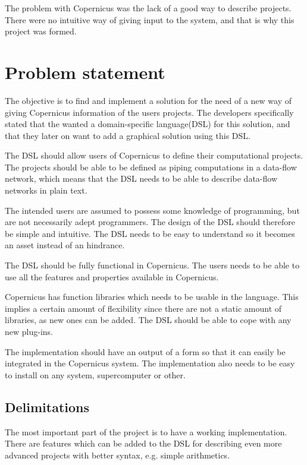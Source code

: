 

The problem with Copernicus was the lack of a good way to describe
projects. There were no intuitive way of giving input to the system,
and that is why this project was formed.


\section{Problem statement}
The objective is to find and implement a solution for the need of a
new way of giving Copernicus information of the users projects. The
developers specifically stated that the wanted a domain-specific
language(DSL) for this solution, and that they later on want to add a
graphical solution using this DSL.

The DSL should allow users of Copernicus to define their computational
projects. The projects should be able to be defined as piping
computations in a data-flow network, which means that the DSL needs to
be able to describe data-flow networks in plain text.

The intended users are assumed to possess some knowledge of
programming, but are not necessarily adept programmers. The design of
the DSL should therefore be simple and intuitive. The DSL needs to be
easy to understand so it becomes an asset instead of an hindrance.

The DSL should be fully functional in Copernicus. The users needs to
be able to use all the features and properties available in
Copernicus.

Copernicus has function libraries which needs to be usable in the
language. This implies a certain amount of flexibility since there are
not a static amount of libraries, as new ones can be added. The DSL
should be able to cope with any new plug-ins.

The implementation should have an output of a form so that it can
easily be integrated in the Copernicus system. The implementation
also needs to be easy to install on any system, supercomputer or
other.

\subsection{Delimitations}
The most important part of the project is to have a working
implementation. There are features which can be added to the DSL for
describing even more advanced projects with better syntax, e.g. simple
arithmetics.

